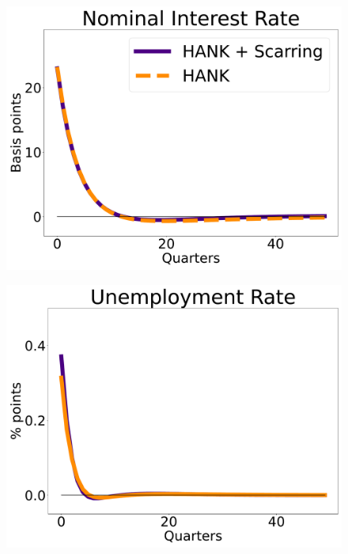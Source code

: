 \begin{figure}[htb]
    \centering %
\begin{minipage}{0.33\textwidth}
  \includegraphics[scale=.14]{text/chapter1/Figures/IPRs_ev/i_IPR_ev}
  \label{fig:1}
\end{minipage}\hfil %
\begin{minipage}{0.33\textwidth}
  \includegraphics[scale=.14]{text/chapter1/Figures/IPRs_ev/U_IPR_ev}
  \label{fig:2}
\end{minipage}\hfil %
\begin{minipage}{0.33\textwidth}

\end{minipage}
\end{figure}
